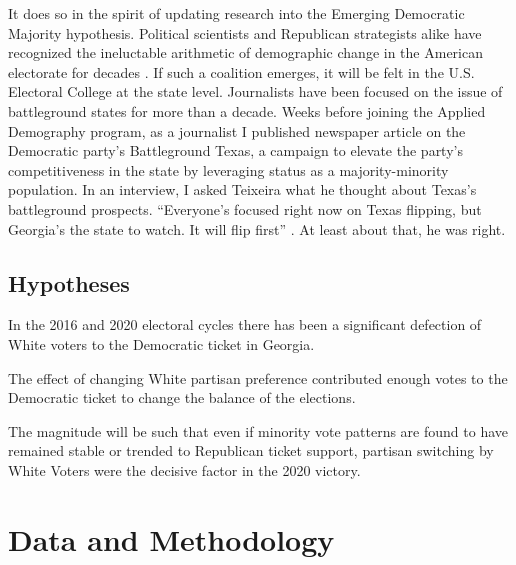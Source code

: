 It does so in the spirit of updating research into the Emerging Democratic Majority hypothesis. Political scientists and Republican strategists alike have recognized the ineluctable arithmetic of demographic change in the American electorate for decades \citep{judis_emerging_2002, teixeira_demographic_2010, frey_karl_2014}. If such a coalition emerges, it will be felt in the U.S. Electoral College at the state level. Journalists have been focused on the issue of battleground states for more than a decade. Weeks before joining the Applied Demography program, as a journalist I published newspaper article on the Democratic party's Battleground Texas, a campaign to elevate the party's competitiveness in the state by leveraging status as a majority-minority population. In an interview, I asked Teixeira what he thought about Texas's battleground prospects. ``Everyone's focused right now on Texas flipping, but Georgia's the state to watch. It will flip first'' \citep{Personal_Communication_Teixeira}. At least about that, he was right.  


\subsection{Hypotheses}

\begin{hypothesis}In the 2016 and 2020 electoral cycles there has been a significant defection of White voters to the Democratic ticket in Georgia.\end{hypothesis}

\begin{hypothesis}
The effect of changing White partisan preference contributed enough votes to the Democratic ticket to change the balance of the elections.  
\end{hypothesis}

\begin{hypothesis}
The magnitude will be such that even if minority vote patterns are found to have remained stable or trended to Republican ticket support, partisan switching by White Voters were the decisive factor in the 2020 victory.  
\end{hypothesis}



\section{Data and Methodology}

